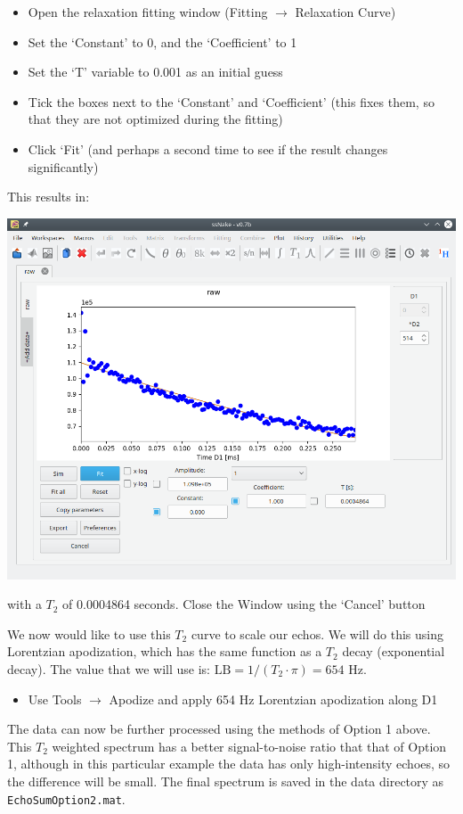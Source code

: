 \documentclass[11pt,a4paper]{article}
\begin{document}
\begin{itemize}
\item Open the relaxation fitting window (Fitting $\longrightarrow$ Relaxation Curve)
\item Set the `Constant' to 0, and the `Coefficient' to 1
\item Set the `T' variable to 0.001 as an initial guess
\item Tick the boxes next to the `Constant' and `Coefficient' (this fixes them, so that they are not optimized during the fitting)
\item Click `Fit' (and perhaps a second time to see if the result changes significantly)
\end{itemize}
This results in:
\begin{center}
\includegraphics[width=0.7\linewidth]{Figs/Fig8.png}
\end{center}
with a $T_2$ of 0.0004864 seconds.
Close the Window using the `Cancel' button

We now would like to use this $T_2$ curve to scale our echos.
We will do this using Lorentzian apodization, which has the same function as a $T_2$ decay (exponential decay).
The value that we will use is: $\text{LB} = 1/(T_2 \cdot \pi) = 654$ Hz.


\begin{itemize}
  \item Use Tools $\longrightarrow$ Apodize and apply 654 Hz Lorentzian apodization along D1
\end{itemize}
The data can now be further processed using the methods of Option 1 above.
This $T_2$ weighted spectrum has a better signal-to-noise ratio that that of Option 1, although in this particular example the data has only high-intensity echoes, so the difference will be small.
The final spectrum is saved in the data directory as \texttt{EchoSumOption2.mat}.
\end{document}
